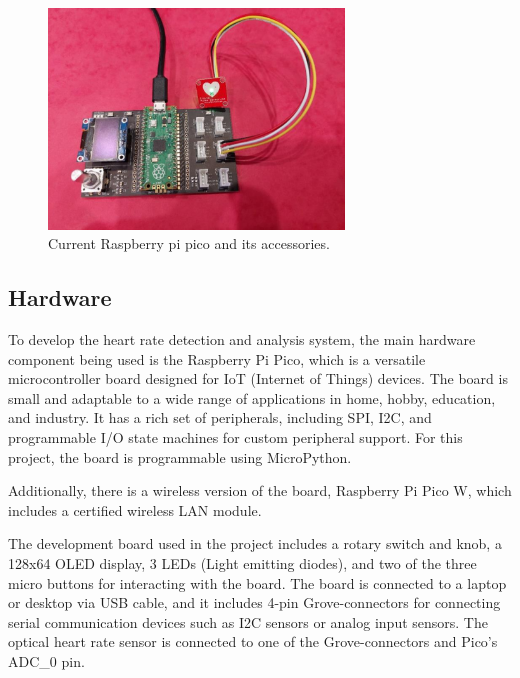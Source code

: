 \documentclass{article}
\begin{document}
\begin{figure}[h]
  \centering
  \includegraphics[width=0.7\textwidth]{raspi_heart.png}
  \caption{ Current Raspberry pi pico and its accessories.}
  \label{harrin}
\end{figure}



\subsection{Hardware}

To develop the heart rate detection and analysis system, the main hardware component being used is the Raspberry Pi Pico, which is a versatile microcontroller board designed for IoT (Internet of Things) devices. The board is small and adaptable to a wide range of applications in home, hobby, education, and industry. It has a rich set of peripherals, including SPI, I2C, and programmable I/O state machines for custom peripheral support. For this project, the board is programmable using MicroPython.



Additionally, there is a wireless version of the board, Raspberry Pi Pico W, which includes a certified wireless LAN module.



The development board used in the project includes a rotary switch and knob, a 128x64 OLED display, 3 LEDs (Light emitting diodes), and two of the three micro buttons for interacting with the board. The board is connected to a laptop or desktop via USB cable, and it includes 4-pin Grove-connectors for connecting serial communication devices such as I2C sensors or analog input sensors. The optical heart rate sensor is connected to one of the Grove-connectors and Pico’s ADC\_0 pin.
\end{document}
